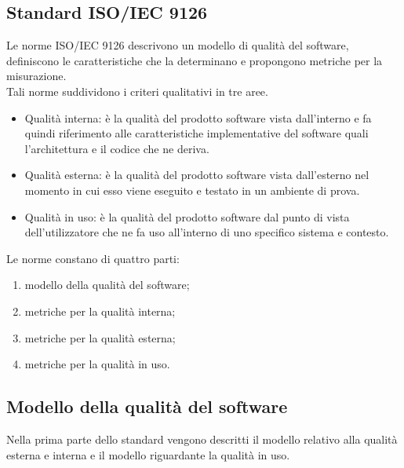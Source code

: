 \documentclass[../PianoDiQualifica.tex]{subfiles}
\begin{document}
\begin{appendices}

\section{Standard ISO/IEC 9126}
	Le norme ISO/IEC 9126 descrivono un modello di qualità del software, definiscono le caratteristiche che la determinano e propongono metriche per la misurazione.\\
	Tali norme suddividono i criteri qualitativi in tre aree.
	\begin{itemize}
		\item Qualità interna: è la qualità del prodotto software vista dall'interno e fa quindi riferimento alle caratteristiche implementative del software quali l'architettura e il codice che ne deriva.
		\item Qualità esterna: è la qualità del prodotto software vista dall'esterno nel momento in cui esso viene eseguito e testato in un ambiente di prova.
		\item Qualità in uso: è la qualità del prodotto software dal punto di vista dell'utilizzatore che ne fa uso all'interno di uno specifico sistema e contesto.
	\end{itemize}
	Le norme constano di quattro parti:
	\begin{enumerate}
		\item modello della qualità del software;
		\item metriche per la qualità interna;
		\item metriche per la qualità esterna;
		\item metriche per la qualità in uso.
	\end{enumerate}
	
	\subsection{Modello della qualità del software}
	Nella prima parte dello standard vengono descritti il modello relativo alla qualità esterna e interna e il modello riguardante la qualità in uso.
	

\end{appendices}
\end{document}
